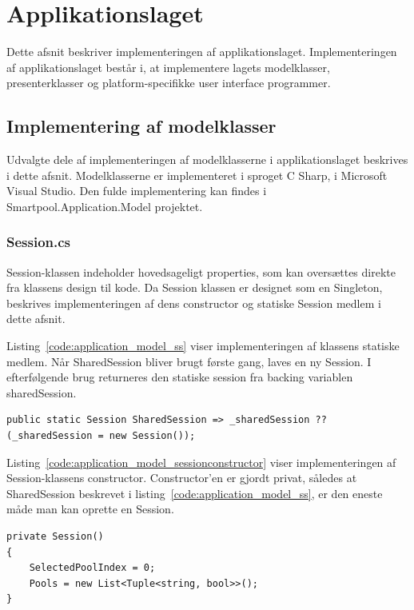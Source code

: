 \section{Applikationslaget}
Dette afsnit beskriver implementeringen af applikationslaget. Implementeringen af applikationslaget består i, at implementere lagets modelklasser, presenterklasser og platform-specifikke user interface programmer. 

\subsection{Implementering af modelklasser}
Udvalgte dele af implementeringen af modelklasserne i applikationslaget beskrives i dette afsnit. Modelklasserne er implementeret i sproget C Sharp, i Microsoft Visual Studio. Den fulde implementering kan findes i Smartpool.Application.Model projektet.

\subsubsection{Session.cs}
Session-klassen indeholder hovedsageligt properties, som kan oversættes direkte fra klassens design til kode. Da Session klassen er designet som en Singleton, beskrives implementeringen af dens constructor og statiske Session medlem i dette afsnit.

Listing~\ref{code:application_model_ss} viser implementeringen af klassens statiske medlem. Når SharedSession bliver brugt første gang, laves en ny Session. I efterfølgende brug returneres den statiske session fra backing variablen sharedSession.

\begin{lstlisting}[caption={SharedSession},label={code:application_model_ss}]
public static Session SharedSession => _sharedSession ?? (_sharedSession = new Session());
\end{lstlisting}

Listing~\ref{code:application_model_sessionconstructor} viser implementeringen af Session-klassens constructor. Constructor'en er gjordt privat, således at SharedSession beskrevet i listing~\ref{code:application_model_ss}, er den eneste måde man kan oprette en Session.

\begin{lstlisting}[caption={Session constructor},label={code:application_model_sessionconstructor}]
private Session()
{
	SelectedPoolIndex = 0;
	Pools = new List<Tuple<string, bool>>();
}
\end{lstlisting}

